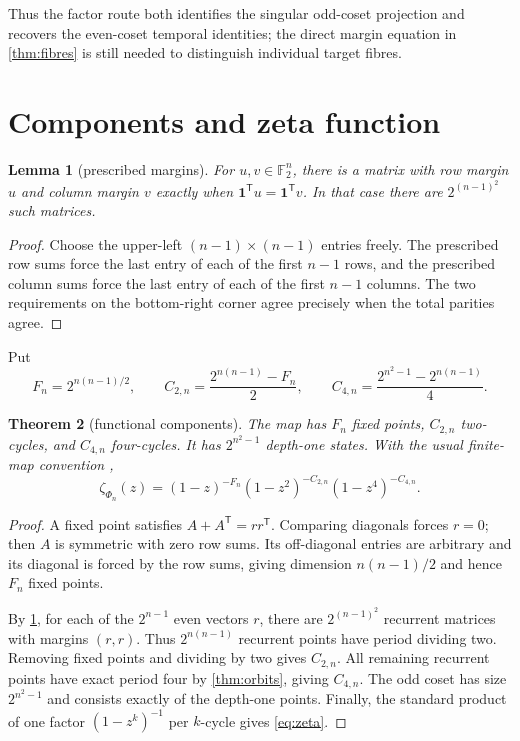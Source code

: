 \documentclass[10pt,a4paper]{amsart}
\newtheorem{theorem}{Theorem}[section]
\newtheorem{lemma}[theorem]{Lemma}
\theoremstyle{definition}
\theoremstyle{remark}
\newcommand{\F}{\mathbb F_2}
\newcommand{\one}{\mathbf 1}
\begin{document}
Thus the factor route both identifies the singular odd-coset projection and
recovers the even-coset temporal identities; the direct margin equation in
\cref{thm:fibres} is still needed to distinguish individual target fibres.

\section{Components and zeta function}

\begin{lemma}[prescribed margins]\label{lem:margins}
For $u,v\in\F^n$, there is a matrix with row margin $u$ and column margin
$v$ exactly when $\one^{\mathsf T}u=\one^{\mathsf T}v$.  In that case there
are $2^{(n-1)^2}$ such matrices.
\end{lemma}

\begin{proof}
Choose the upper-left $(n-1)\times(n-1)$ entries freely.  The prescribed row
sums force the last entry of each of the first $n-1$ rows, and the prescribed
column sums force the last entry of each of the first $n-1$ columns.  The two
requirements on the bottom-right corner agree precisely when the total
parities agree.
\end{proof}

Put
\[
 F_n=2^{n(n-1)/2},\qquad
 C_{2,n}=\frac{2^{n(n-1)}-F_n}{2},\qquad
 C_{4,n}=\frac{2^{n^2-1}-2^{n(n-1)}}{4}.
\]

\begin{theorem}[functional components]\label{thm:census}
The map has $F_n$ fixed points, $C_{2,n}$ two-cycles, and $C_{4,n}$
four-cycles.  It has $2^{n^2-1}$ depth-one states.  With the usual finite-map
convention \cite{ArtinMazur1965},
\begin{equation}
 \zeta_{\Phi_n}(z)=
 (1-z)^{-F_n}(1-z^2)^{-C_{2,n}}(1-z^4)^{-C_{4,n}}.       \label{eq:zeta}
\end{equation}
\end{theorem}

\begin{proof}
A fixed point satisfies $A+A^{\mathsf T}=rr^{\mathsf T}$.  Comparing
diagonals forces $r=0$; then $A$ is symmetric with zero row sums.  Its
off-diagonal entries are arbitrary and its diagonal is forced by the row
sums, giving dimension $n(n-1)/2$ and hence $F_n$ fixed points.

By \cref{lem:margins}, for each of the $2^{n-1}$ even vectors $r$, there are
$2^{(n-1)^2}$ recurrent matrices with margins $(r,r)$.  Thus
$2^{n(n-1)}$ recurrent points have period dividing two.  Removing fixed
points and dividing by two gives $C_{2,n}$.  All remaining recurrent points
have exact period four by \cref{thm:orbits}, giving $C_{4,n}$.  The odd
coset has size $2^{n^2-1}$ and consists exactly of the depth-one points.
Finally, the standard product of one factor $(1-z^k)^{-1}$ per $k$-cycle
gives \eqref{eq:zeta}.
\end{proof}
\end{document}
